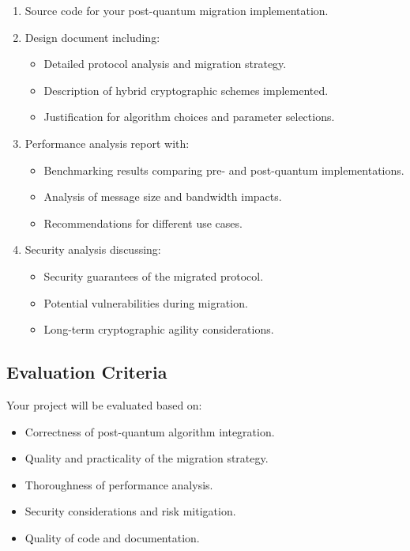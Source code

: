 \documentclass[10pt,a4paper,american]{article}
\begin{document}
\begin{enumerate}
	\item Source code for your post-quantum migration implementation.
	\item Design document including:
	      \begin{itemize}
		      \item Detailed protocol analysis and migration strategy.
		      \item Description of hybrid cryptographic schemes implemented.
		      \item Justification for algorithm choices and parameter selections.
	      \end{itemize}
	\item Performance analysis report with:
	      \begin{itemize}
		      \item Benchmarking results comparing pre- and post-quantum implementations.
		      \item Analysis of message size and bandwidth impacts.
		      \item Recommendations for different use cases.
	      \end{itemize}
	\item Security analysis discussing:
	      \begin{itemize}
		      \item Security guarantees of the migrated protocol.
		      \item Potential vulnerabilities during migration.
		      \item Long-term cryptographic agility considerations.
	      \end{itemize}
\end{enumerate}

\subsection*{Evaluation Criteria}
Your project will be evaluated based on:

\begin{itemize}
	\item Correctness of post-quantum algorithm integration.
	\item Quality and practicality of the migration strategy.
	\item Thoroughness of performance analysis.
	\item Security considerations and risk mitigation.
	\item Quality of code and documentation.
\end{itemize}
\end{document}
